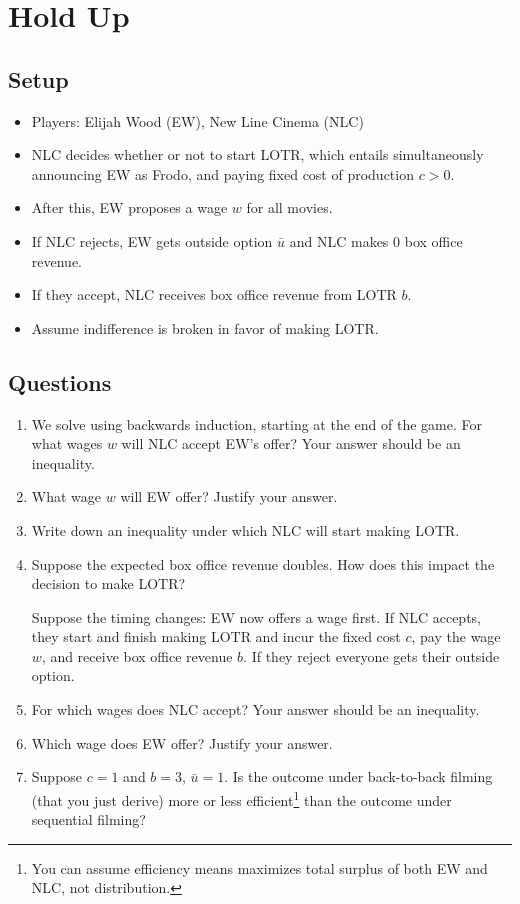 \documentclass{article}
\begin{document}
\section{Hold Up}


\subsection{Setup}

\begin{itemize}
    \item Players: Elijah Wood (EW), New Line Cinema (NLC) 
    \item NLC decides whether or not to start LOTR, which entails simultaneously announcing EW as Frodo, and paying fixed cost of production $c>0$.
    \item After this, EW proposes a wage $w$ for all movies.
    \item If NLC rejects, EW gets outside option $\bar u$ and NLC makes 0 box office revenue.
    \item If they accept, NLC receives box office revenue from LOTR $b$.
    \item Assume indifference is broken in favor of making LOTR.
\end{itemize}

\subsection{Questions}

\begin{enumerate}
\item We solve using backwards induction, starting at the end of the game. For what wages $w$ will NLC accept EW's offer? Your answer should be an inequality.
\item What wage $w$ will EW offer? Justify your answer.

\item Write down an inequality under which NLC will start making LOTR.

\item Suppose the expected box office revenue doubles. How does this impact the decision to make LOTR?
    

    Suppose the timing changes: EW now offers a wage first. If NLC accepts, they start and finish making LOTR and incur the fixed cost $c$, pay the wage $w$, and receive box office revenue $b$. If they reject everyone gets their outside option.

    \item For which wages does NLC accept? Your answer should be an inequality.

\item Which wage does EW offer? Justify your answer.

    \item Suppose $c=1$ and $b=3$, $\bar u =1$. Is the outcome under back-to-back filming (that you just derive) more or less efficient\footnote{You can assume efficiency means maximizes total surplus of both EW and NLC, not distribution.} than the outcome under sequential filming?

    
\end{enumerate}
\end{document}
